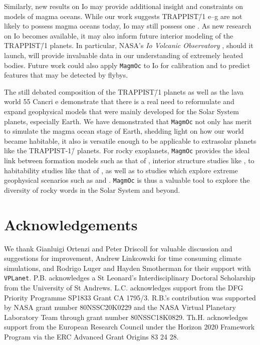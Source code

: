 \documentclass[oneside,twocolumn]{article}
\newcommand{\vplanet}{\texttt{\footnotesize{VPLanet}}}
\newcommand{\magmoc}{\texttt{\footnotesize{MagmOc}}}
\begin{document}
Similarly, new results on Io may provide additional insight and constraints on models of magma oceans. While our work suggests TRAPPIST\=/1 e--g are not likely to possess magma oceans today, Io may still possess one \citep{Khurana11,Tyler15}. As new research on Io becomes available, it may also inform future interior modeling of the TRAPPIST\=/1 planets. In particular, NASA's \emph{Io Volcanic Observatory} \citep{McEwen14}, should it launch, will provide invaluable data in our understanding of extremely heated bodies. Future work could also apply \magmoc{} to Io for calibration and to predict features that may be detected by flybys.

The still debated composition of the TRAPPIST\=/1 planets as well as the lava world 55 Cancri e demonstrate that there is a real need to reformulate and expand geophysical models that were mainly developed for the Solar System planets, especially Earth. We have demonstrated that \magmoc{} not only has merit to simulate the magma ocean stage of Earth, shedding light on how our world became habitable, it also is versatile enough to be applicable to extrasolar planets like the TRAPPIST-1\=/ planets. For rocky exoplanets, \magmoc{} provides the ideal link between formation models such as that of \citet{Miguel2020}, interior structure studies like \citet{Noack2016,Dorn2018,Unterborn2018}, to habitability studies like that of \citet{lingam2020}, as well as to studies which explore extreme geophysical scenarios such as \citet{Kislyakova2017} and \citet{Millholland2019}. \magmoc{} is thus a valuable tool to explore the diversity of rocky words in the Solar System and beyond.

\section*{Acknowledgements}

We thank Gianluigi Ortenzi and Peter Driscoll for valuable discussion and suggestions for improvement, Andrew Linkcowski for time consuming climate simulations, and Rodrigo Luger and Hayden Smotherman for their support with \vplanet{}.
P.B. acknowledges a St Leonard's Interdisciplinary Doctoral Scholarship from the University of St Andrews.
L.C. acknowledges support from the DFG Priority Programme SP1833 Grant CA 1795/3.
R.B.'s contribution was supported by NASA grant number 80NSSC20K0229 and the NASA Virtual Planetary Laboratory Team through grant number 80NSSC18K0829.
Th.H. acknowledges support from the European Research Council under the Horizon 2020 Framework Program via the ERC Advanced Grant Origins 83 24 28.
\end{document}
